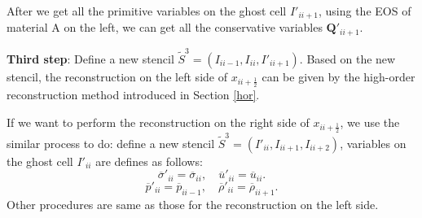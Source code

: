 \documentclass[review]{elsarticle}
\begin{document}
After we get all the primitive variables on  the ghost cell $I'_{ii+1}$, using the EOS of material A on the left, we can get all the conservative variables  $\mathbf{Q}'_{ii+1}$. 

\textbf{Third  step}: Define a new stencil $\widetilde{S}^3=(I_{ii-1},I_{ii}, I'_{ii+1})$. Based on the new stencil, the reconstruction on the left side of $x_{ii+\frac{1}{2}}$  can be given by the high-order reconstruction method introduced in  Section \ref{hor}.


If we want to perform the reconstruction on the right side of $x_{ii+\frac{1}{2}}$, we use the similar process to do: define a new stencil $\widetilde{S}^3=(I'_{ii},I_{ii+1}, I_{ii+2})$, variables on the  ghost cell $I'_{ii}$ are defines as follows:
\begin{equation*}
  \overline{\sigma}'_{ii} = \overline{\sigma}_{ii}, \quad \overline{u}'_{ii} = \overline{u}_{ii}.
\end{equation*}
\begin{equation*}
\overline{p}'_{ii} = \overline{p}_{ii-1}, \quad \overline{\rho}'_{ii} = \overline{\rho}_{ii+1}.
\end{equation*}
Other procedures are same as those for the reconstruction on the left side. 
\end{document}
